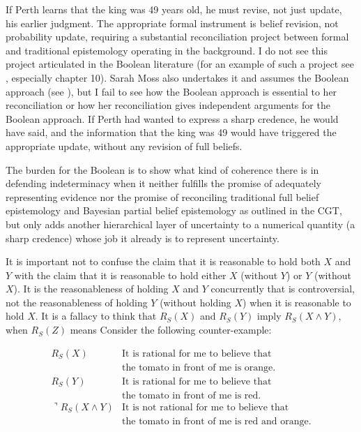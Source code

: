 \documentclass[11pt]{article}
\begin{document}
If Perth learns that the king was 49 years old, he must revise, not
just update, his earlier judgment. The appropriate formal instrument
is belief revision, not probability update, requiring a substantial
reconciliation project between formal and traditional epistemology
operating in the background. I do not see this project articulated in
the Boolean literature (for an example of such a project see
, especially chapter 10). Sarah Moss also
undertakes it and assumes the Boolean approach (see
), but I fail to see how the Boolean approach is
essential to her reconciliation or how her reconciliation gives
independent arguments for the Boolean approach. If Perth had wanted to
express a sharp credence, he would have said,  and the information that the king
was 49 would have triggered the appropriate update, without any
revision of full beliefs.

The burden for the Boolean is to show what kind of coherence there is
in defending indeterminacy when it neither fulfills the promise of
adequately representing evidence nor the promise of reconciling
traditional full belief  epistemology and Bayesian
partial belief epistemology as outlined in the CGT, but only adds
another hierarchical layer of uncertainty to a numerical quantity (a
sharp credence) whose job it already is to represent
uncertainty.

It is important not to confuse the claim that it is reasonable to hold
both $X$ and $Y$ with the claim that it is reasonable to hold either
$X$ (without $Y$) or $Y$ (without $X$). It is the reasonableness of
holding $X$ and $Y$ concurrently that is controversial, not the
reasonableness of holding $Y$ (without holding $X$) when it is
reasonable to hold $X$. It is a fallacy to think that $R_{S}(X)$ and
$R_{S}(Y)$ imply $R_{S}(X\wedge{}Y)$, when $R_{S}(Z)$ means  Consider the following
counter-example:

\begin{displaymath}
  \begin{array}{rl}
    R_{S}(X) & \mbox{It is rational for me to believe that} \\
        & \mbox{the tomato in front of me is orange.} \\
    R_{S}(Y) & \mbox{It is rational for me to believe that} \\
        & \mbox{the tomato in front of me is red.} \\
    \urcorner{}R_{S}(X\wedge{}Y) & \mbox{It is not rational for me to believe that} \\
        & \mbox{the tomato in front of me is red and orange.} \\
  \end{array}
\end{displaymath}
\end{document}
